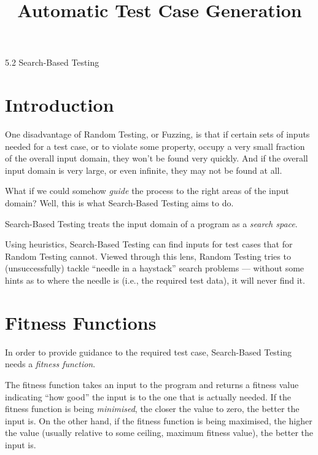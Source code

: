 



\title{Automatic Test Case Generation}{5.2 Search-Based Testing}

\section{Introduction}


One disadvantage of Random Testing, or Fuzzing, is that if certain sets of
inputs needed for a test case, or to violate some property, occupy a very small
fraction of the overall input domain, they won't be found very quickly. And if
the overall input domain is very large, or even infinite, they may not be found
at all.


What if we could somehow {\it guide} the process to the right areas of the input
domain? Well, this is what Search-Based Testing aims to do. 


Search-Based Testing treats the input domain of a program as a {\it search
space}. 


Using heuristics, Search-Based Testing can find inputs for test cases that for
Random Testing cannot. Viewed through this lens, Random Testing tries to
(unsuccessfully) tackle ``needle in a haystack'' search problems --- without
some hints as to where the needle is (i.e., the required test data), it will
never find it.


\section{Fitness Functions}


In order to provide guidance to the required test case, Search-Based Testing
needs a {\it fitness function}. 


The fitness function takes an input to the program and returns a {fitness value}
indicating ``how good'' the input is to the one that is actually needed. If the
fitness function is being {\it minimised}, the closer the value to zero, the
better the input is. On the other hand, if the fitness function is being
maximised, the higher the value (usually relative to some ceiling, maximum
fitness value), the better the input is.

